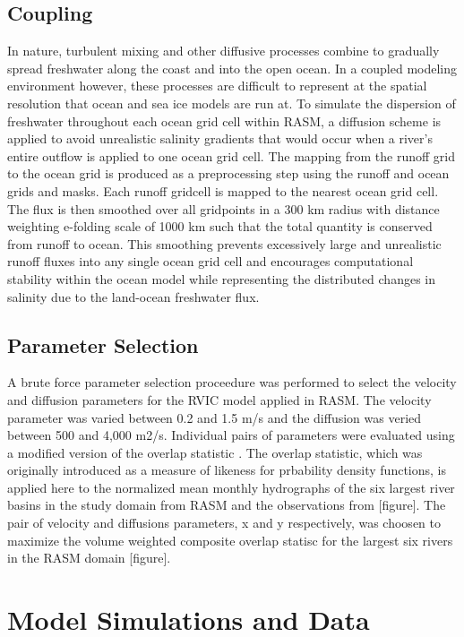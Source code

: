 \documentclass[jgrga, draft]{agutex}
\begin{document}
\begin{article}
\subsection{Coupling}

In nature, turbulent mixing and other diffusive processes combine to gradually spread freshwater along the coast and into the open ocean.
In a coupled modeling environment however, these processes are difficult to represent at the spatial resolution that ocean and sea ice models are run at.
To simulate the dispersion of freshwater throughout each ocean grid cell within RASM, a diffusion scheme is applied to avoid unrealistic salinity gradients that would occur when a river’s entire outflow is applied to one ocean grid cell.
The mapping from the runoff grid to the ocean grid is produced as a preprocessing step using the runoff and ocean grids and masks.
Each runoff gridcell is mapped to the nearest ocean grid cell.
The flux is then smoothed over all gridpoints in a 300 km radius with distance weighting e-folding scale of 1000 km such that the total quantity is conserved from runoff to ocean.
This smoothing prevents excessively large and unrealistic runoff fluxes into any single ocean grid cell and encourages computational stability within the ocean model while representing the distributed changes in salinity due to the land-ocean freshwater flux.

\subsection{Parameter Selection}

A brute force parameter selection proceedure was performed to select the velocity and diffusion parameters for the RVIC model applied in RASM.
The velocity parameter was varied between 0.2 and 1.5 m/s and the diffusion was veried between 500 and 4,000 m2/s.
Individual pairs of parameters were evaluated using a modified version of the overlap statistic \citet{Perkins_2012}.
The overlap statistic, which was originally introduced as a measure of likeness for prbability density functions, is applied here to the normalized mean monthly hydrographs of the six largest river basins in the study domain from RASM and the observations from \citet{Dai_2009} [figure].
The pair of velocity and diffusions parameters, x and y respectively, was choosen to maximize the volume weighted composite overlap statisc for the largest six rivers in the RASM domain [figure].

\section{Model Simulations and Data}


\end{article}
\end{document}
